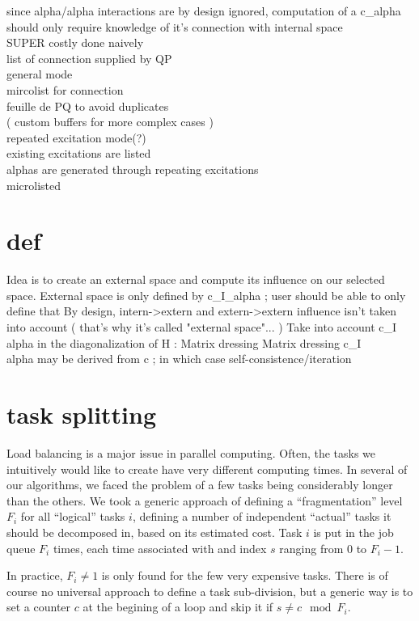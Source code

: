 \documentclass[./thesis.tex]{subfiles}
\begin{document}
since alpha/alpha interactions are by design ignored, computation of a c\_alpha should only require knowledge of it's connection with internal space \\
SUPER costly done naively \\
list of connection supplied by QP \\
general mode \\
mircolist for connection \\
feuille de PQ to avoid duplicates \\
( custom buffers for more complex cases ) \\
repeated excitation mode(?)  \\
existing excitations are listed \\
alphas are generated through repeating excitations \\

microlisted \\
\section{def}
Idea is to create an external space and compute its influence on our selected space.
External space is only defined by c\_I\_alpha ; user should be able to only define that
By design, intern->extern and extern->extern influence isn't taken into account ( that's why it's called "external space"... )
Take into account c\_I\\alpha in the diagonalization of H : Matrix dressing
Matrix dressing
c\_I\\alpha may be derived from c ; in which case self-consistence/iteration

\section{task splitting}

Load balancing is a major issue in parallel computing. Often, the tasks we intuitively would like to create have very different computing times. In several of our algorithms, we faced the problem of a few tasks being considerably longer than the others. We took a generic approach of defining a ``fragmentation'' level $F_i$ for all ``logical'' tasks $i$, defining a number of independent ``actual'' tasks it should be decomposed in, based on its estimated cost. Task $i$ is put in the job queue $F_i$ times, each time associated with and index $s$ ranging from $0$ to $F_i-1$.

In practice, $F_i \neq 1$ is only found for the few very expensive tasks.
There is of course no universal approach to define a task sub-division, but a generic way is to set a counter $c$ at the begining of a loop and skip it if $s \neq c \mod F_i$.
\end{document}
